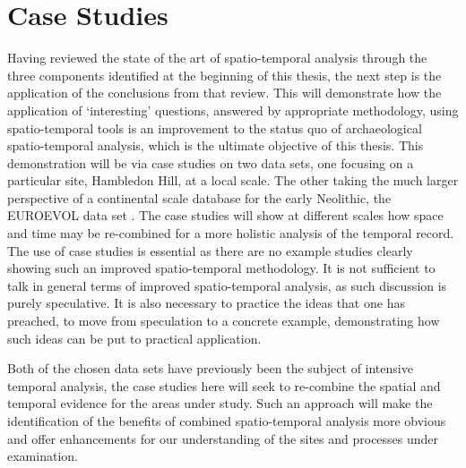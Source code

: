 \chapter{Case Studies}  %
\label{ch:studies}
Having reviewed the state of the art of spatio-temporal analysis through the three components identified at the beginning of this thesis, the next step is the application of the conclusions from that review. This will demonstrate how the application of `interesting' questions, answered by appropriate methodology, using spatio-temporal tools is an improvement to the status quo of archaeological spatio-temporal analysis, which is the ultimate objective of this thesis. This demonstration will be via case studies on two data sets, one focusing on a particular site, Hambledon Hill, at a local scale. The other taking the much larger perspective of a continental scale database for the early Neolithic, the EUROEVOL data set \citep{Manning:2016fk}. The case studies will show at different scales how space and time may be re-combined for a more holistic analysis of the temporal record. The use of case studies is essential as there are no example studies clearly showing such an improved spatio-temporal methodology. It is not sufficient to talk in general terms of improved spatio-temporal analysis, as such discussion is purely speculative. It is also necessary to practice the ideas that one has preached, to move from speculation to a concrete example, demonstrating how such ideas can be put to practical application. 

Both of the chosen data sets have previously been the subject of intensive temporal analysis, the case studies here will seek to re-combine the spatial and temporal evidence for the areas under study. Such an approach will make the identification of the benefits of combined spatio-temporal analysis more obvious and offer enhancements for our understanding of the sites and processes under examination.

